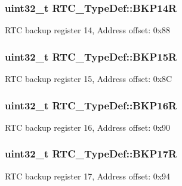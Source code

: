 \subsubsection[{\texorpdfstring{B\+K\+P14R}{BKP14R}}]{ uint32\+\_\+t R\+T\+C\+\_\+\+Type\+Def\+::\+B\+K\+P14R}\hypertarget{struct_r_t_c___type_def_adaae50f5c3213014fb9818eaee389676}{}\label{struct_r_t_c___type_def_adaae50f5c3213014fb9818eaee389676}
R\+TC backup register 14, Address offset\+: 0x88 
\subsubsection[{\texorpdfstring{B\+K\+P15R}{BKP15R}}]{ uint32\+\_\+t R\+T\+C\+\_\+\+Type\+Def\+::\+B\+K\+P15R}\hypertarget{struct_r_t_c___type_def_a797f43f9cc1858baebd1799be288dff6}{}\label{struct_r_t_c___type_def_a797f43f9cc1858baebd1799be288dff6}
R\+TC backup register 15, Address offset\+: 0x8C 
\subsubsection[{\texorpdfstring{B\+K\+P16R}{BKP16R}}]{ uint32\+\_\+t R\+T\+C\+\_\+\+Type\+Def\+::\+B\+K\+P16R}\hypertarget{struct_r_t_c___type_def_a181ad73082bde7d74010aac16bd373fc}{}\label{struct_r_t_c___type_def_a181ad73082bde7d74010aac16bd373fc}
R\+TC backup register 16, Address offset\+: 0x90 
\subsubsection[{\texorpdfstring{B\+K\+P17R}{BKP17R}}]{ uint32\+\_\+t R\+T\+C\+\_\+\+Type\+Def\+::\+B\+K\+P17R}\hypertarget{struct_r_t_c___type_def_a90a305a8e00b357f28daef5041e5a8b1}{}\label{struct_r_t_c___type_def_a90a305a8e00b357f28daef5041e5a8b1}
R\+TC backup register 17, Address offset\+: 0x94 
